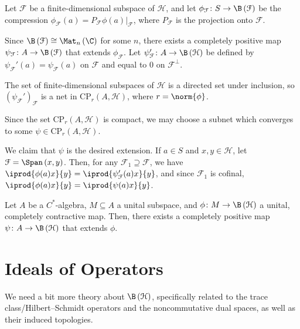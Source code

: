 \documentclass[10pt]{mypackage}
\begin{document}
\begin{theorem}
  Let $\mathcal{F}$ be a finite-dimensional subspace of $\mathcal{H}$, and let $\phi_{\mathcal{F}}\colon S\rightarrow \B\left( \mathcal{F} \right)$ be the compression $\phi_{\mathcal{F}}\left( a \right) = P_{\mathcal{F}}\phi(a)|_{\mathcal{F}}$, where $P_{\mathcal{F}}$ is the projection onto $\mathcal{F}$.\newline

  Since $\B\left( \mathcal{F} \right)\cong \Mat_n\left( \C \right)$ for some $n$, there exists a completely positive map $\psi_{\mathcal{F}}\colon A\rightarrow \B\left( \mathcal{F} \right)$ that extends $\phi_{\mathcal{F}}$. Let $\psi_{\mathcal{F}}'\colon A\rightarrow \B\left( \mathcal{H} \right)$ be defined by $\psi_{\mathcal{F}}'\left( a \right) = \psi_{\mathcal{F}}(a)$ on $\mathcal{F}$ and equal to $0$ on $\mathcal{F}^{\perp}$.\newline

  The set of finite-dimensional subspaces of $\mathcal{H}$ is a directed set under inclusion, so $\left( \psi_{\mathcal{F}}' \right)_{\mathcal{F}}$ is a net in $\text{CP}_{r}\left( A,\mathcal{H} \right)$, where $r = \norm{\phi}$.\newline

  Since the set $\text{CP}_{r}\left( A,\mathcal{H} \right)$ is compact, we may choose a subnet which converges to some $\psi\in \text{CP}_{r}\left( A,\mathcal{H} \right)$.\newline

  We claim that $\psi$ is the desired extension. If $a\in S$ and $x,y\in \mathcal{H}$, let $\mathcal{F} = \Span\left( x,y \right)$. Then, for any $\mathcal{F}_1\supseteq \mathcal{F}$, we have $ \iprod{\phi(a)x}{y} = \iprod{\psi_{\mathcal{F}}'(a)x}{y} $, and since $\mathcal{F}_1$ is cofinal, $ \iprod{\phi(a)x}{y} = \iprod{\psi(a)x}{y} $.
\end{theorem}
\begin{corollary}
  Let $A$ be a $C^{\ast}$-algebra, $M\subseteq A$ a unital subspace, and $\phi\colon M\rightarrow \B\left( \mathcal{H} \right)$ a unital, completely contractive map. Then, there exists a completely positive map $\psi\colon A\rightarrow \B\left( \mathcal{H} \right)$ that extends $\phi$.
\end{corollary}
\section{Ideals of Operators}%
We need a bit more theory about $\B\left( \mathcal{H} \right)$, specifically related to the trace class/Hilbert--Schmidt operators and the noncommutative dual spaces, as well as their induced topologies. 
\end{document}
